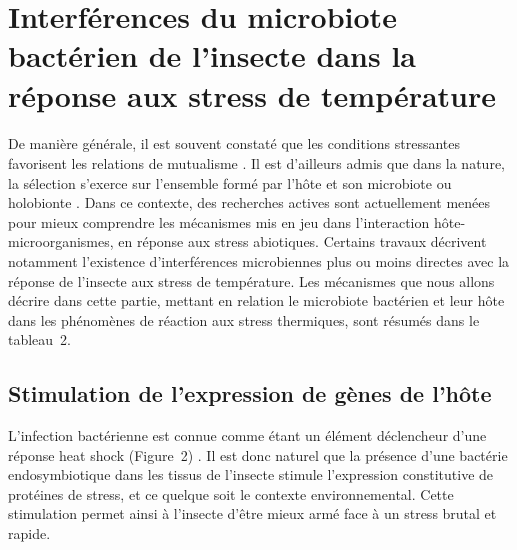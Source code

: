 \section[Interférences du microbiote de l'insecte dans la réponse aux stress de température]%
{Interférences du microbiote bactérien de l'insecte dans la réponse aux stress de température} 

\paragraph*{}
De manière générale, il est souvent constaté que les conditions stressantes favorisent les relations de mutualisme \cite{meadows2013}.
Il est d'ailleurs admis que dans la nature, la sélection s'exerce sur l'ensemble formé par l'hôte et son microbiote ou holobionte \cite{rosenberg2008}.
Dans ce contexte, des recherches actives sont actuellement menées pour mieux comprendre les mécanismes mis en jeu dans l'interaction hôte-microorganismes, en réponse aux stress abiotiques.
Certains travaux décrivent notamment l'existence d'interférences microbiennes plus ou moins directes avec la réponse de l'insecte aux stress de température.
Les mécanismes que nous allons décrire dans cette partie, mettant en relation le microbiote bactérien et leur hôte dans les phénomènes de réaction aux stress thermiques, sont résumés dans le tableau~2.

\subsection{Stimulation de l'expression de gènes de l'hôte}

L'infection bactérienne est connue comme étant un élément déclencheur d'une réponse heat shock (Figure~2) \cite{sorensen2003}.
Il est donc naturel que la présence d'une bactérie endosymbiotique dans les tissus de l'insecte stimule l'expression constitutive de protéines de stress, et ce quelque soit le contexte environnemental.
Cette stimulation permet ainsi à l'insecte d'être mieux armé face à un stress brutal et rapide.

